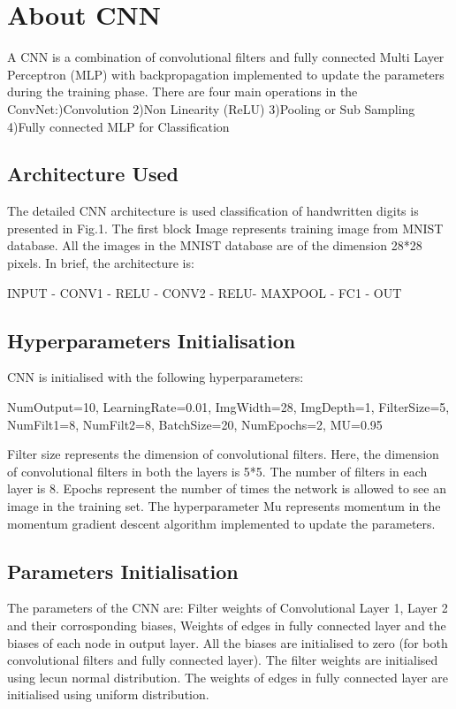 \documentclass[journal,12pt,twocolumn]{IEEEtran}
\begin{document}
\section{About CNN}
A CNN is a combination of convolutional filters and fully connected Multi Layer Perceptron (MLP) with backpropagation implemented to update the parameters during the  training phase.
\linebreak
\linebreak
There are four main operations in the ConvNet:)Convolution
2)Non Linearity (ReLU)
3)Pooling or Sub Sampling
4)Fully connected MLP for Classification

\subsection{Architecture Used}
The detailed CNN architecture is used classification of handwritten digits is presented in Fig.1. The first block Image represents training image from MNIST database. All the images in the MNIST database are of the dimension 28*28 pixels.\linebreak
\linebreak
In brief, the architecture is:

INPUT - CONV1 - RELU - CONV2 - RELU- MAXPOOL - FC1 - OUT
\subsection{Hyperparameters Initialisation}
CNN is initialised with the following hyperparameters:

NumOutput=10,
LearningRate=0.01,	
ImgWidth=28,
ImgDepth=1,
FilterSize=5,
NumFilt1=8,
NumFilt2=8,
BatchSize=20,
NumEpochs=2, 
MU=0.95 

Filter size represents the dimension of convolutional filters. Here, the dimension of convolutional filters in both the layers is 5*5. The number of filters in each layer is 8. Epochs represent the number of times the network is allowed to see an image in the training set. The hyperparameter Mu represents momentum in the momentum gradient descent algorithm implemented to update the parameters.

\subsection{Parameters Initialisation}
The parameters of the CNN are: Filter weights of Convolutional Layer 1, Layer 2 and their corrosponding biases, Weights of edges in fully connected layer and the biases of each node in output layer. All the biases are initialised to zero (for both convolutional filters and fully connected layer). The filter weights are initialised using lecun normal distribution. The weights of edges in fully connected layer are initialised using uniform distribution.
\linebreak
\end{document}
